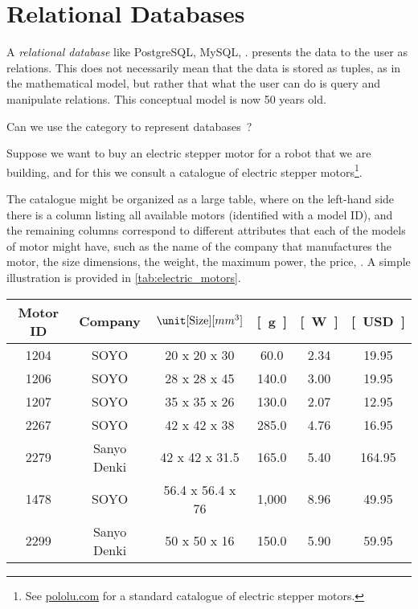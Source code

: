 

\section{Relational Databases}
\label{sec:relational-databases}


A \emph{relational database} like PostgreSQL, MySQL, \etc. presents
the data to the user as relations. This does not necessarily mean
that the data is stored as tuples, as in the mathematical model, but
rather that what the user can do is query and manipulate relations.
This conceptual model is now 50 years old.

Can we use the category \Rel to represent databases~\cite{codd2002relational}?

Suppose we want to buy an electric stepper motor for a robot that we are building, and for this we consult a catalogue of electric stepper motors\footnote{See \href{https://www.pololu.com/category/87/stepper-motors}{pololu.com} for a standard catalogue of electric stepper motors.}.

The catalogue might be organized as a large table, where on the left-hand side there is a column listing all available motors (identified with a model ID), and the remaining columns correspond to different attributes that each of the models of motor might have, such as the name of the company that manufactures the motor, the size dimensions, the weight, the maximum power, the price, \etc.
A simple illustration is provided in \cref{tab:electric_motors}.

\begin{table*}[h]
    \centering
    \begin{tabular}{c|c|c|c|c|c}
        Motor ID & Company & $\unit[\text{Size}]{[mm^3]}$ & \unit[Weight]{[g]} & \unit[Max Power]{[W]}
        & \unit[Cost]{[USD]}
        \\
        \hline
        \textsf{1204} & \textsf{SOYO}        & 20 x 20 x 30     & 60.0  & 2.34 & 19.95  \\
        \textsf{1206} & \textsf{SOYO}        & 28 x 28 x 45     & 140.0 & 3.00 & 19.95  \\
        \textsf{1207} & \textsf{SOYO}        & 35 x 35 x 26     & 130.0 & 2.07 & 12.95  \\
        \textsf{2267} & \textsf{SOYO}        & 42 x 42 x 38     & 285.0 & 4.76 & 16.95  \\
        \textsf{2279} & \textsf{Sanyo Denki} & 42 x 42 x 31.5   & 165.0 & 5.40 & 164.95 \\
        \textsf{1478} & \textsf{SOYO}        & 56.4 x 56.4 x 76 & 1,000 & 8.96 & 49.95  \\
        \textsf{2299} & \textsf{Sanyo Denki} & 50 x 50 x 16     & 150.0 & 5.90 & 59.95
    \end{tabular}

    \caption{A simplified catalogue of motors.}
    \label{tab:electric_motors}
\end{table*}


